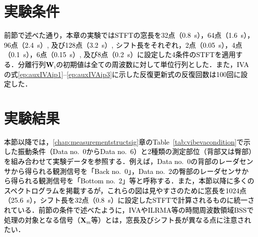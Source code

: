 \section{実験条件}
\label{sec:conv:expcondition4}
\textcolor{black}{前節で述べた通り，本章の実験ではSTFTの窓長を32点（0.8~s），64点（1.6~s），96点（2.4~s）, 及び128点（3.2~s）, シフト長をそれぞれ，2点（0.05~s），4点（0.1~s），6点（0.15~s）, 及び8点（0.2~s）に設定した4条件のSTFTを適用する．分離行列$\bm{W}_{i}$の初期値は全ての周波数に対して単位行列とした．また，IVAの式\eqref{ep:auxIVAip1}--\eqref{ep:auxIVAip3}に示した反復更新式の反復回数は100回に設定した．}

\section{実験結果}
\label{sec:conv:expresult4}

\textcolor{black}{本節以降では，\ref{chap:measurementstructsig}章のTable~\ref{tab:vibevacondition}で示した振動条件（Data no.~0からData no.~6）と2種類の測定部位（背部又は臀部）を組み合わせて実験データを参照する．例えば，Data no.~0の背部のレーダセンサから得られる観測信号を「Back no.~0」，Data no.~2の臀部のレーダセンサから得られる観測信号を「Bottom no.~2」等と呼称する．また，本節以降に多くのスペクトログラムを掲載するが，これらの図は見やすさのために窓長を1024点（25.6~s），シフト長を32点（0.8~s）に設定したSTFTで計算されるものに統一されている．前節の条件で述べたように，IVAやILRMA等の時間周波数領域BSSで処理の対象となる信号（$\bm{X}_m$等）とは，窓長及びシフト長が異なる点に注意されたい．}

